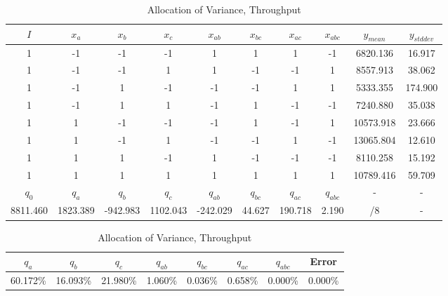 \documentclass[11pt,a4paper]{article}
\begin{document}
\begin{table}
    \begin{subtable}{1.0\linewidth}\centering
        {\begin{tabular}{|cccccccc|cc|}
            \hline
            $I$ & $x_a$ & $x_b$ & $x_c$ & $x_{ab}$ & $x_{bc}$ & $x_{ac}$ & $x_{abc}$ & $y_{mean}$ & $y_{stddev}$\\
            \hline
                    1 &       -1 &       -1 &       -1 &        1 &      1 &       1 &    -1 &  6820.136 &  16.917 \\
                    1 &       -1 &       -1 &        1 &        1 &     -1 &      -1 &     1 &  8557.913 &  38.062 \\
                    1 &       -1 &        1 &       -1 &       -1 &     -1 &       1 &     1 &  5333.355 & 174.900 \\
                    1 &       -1 &        1 &        1 &       -1 &      1 &      -1 &    -1 &  7240.880 &  35.038 \\
                    1 &        1 &       -1 &       -1 &       -1 &      1 &      -1 &     1 & 10573.918 &  23.666 \\
                    1 &        1 &       -1 &        1 &       -1 &     -1 &       1 &    -1 & 13065.804 &  12.610 \\
                    1 &        1 &        1 &       -1 &        1 &     -1 &      -1 &    -1 &  8110.258 &  15.192 \\
                    1 &        1 &        1 &        1 &        1 &      1 &       1 &     1 & 10789.416 &  59.709 \\
            \hline
            $q_0$ & $q_a$ & $q_b$ & $q_c$ & $q_{ab}$ & $q_{bc}$ & $q_{ac}$ & $q_{abc}$ & - & -\\
             8811.460 & 1823.389 & -942.983 & 1102.043 & -242.029 & 44.627 & 190.718 & 2.190 &  /8 &       - \\
            \hline
        \end{tabular}
        \caption{Parameters and Effect Sizes, Throughput}}
    \end{subtable}
    \begin{subtable}{1.0\linewidth}\centering
        {\begin{tabular}{|cccccccc|}
            \hline
            $q_a$ & $q_b$ & $q_c$ & $q_{ab}$ & $q_{bc}$ & $q_{ac}$ & $q_{abc}$ & Error \\
            \hline
            60.172\% &   16.093\% &   21.980\% &    1.060\% &  0.036\% &   0.658\% & 0.000\% &     0.000\% \\
            \hline
        \end{tabular}
        \caption{Allocation of Variance, Throughput}}
    \end{subtable}


\end{table}
\end{document}
